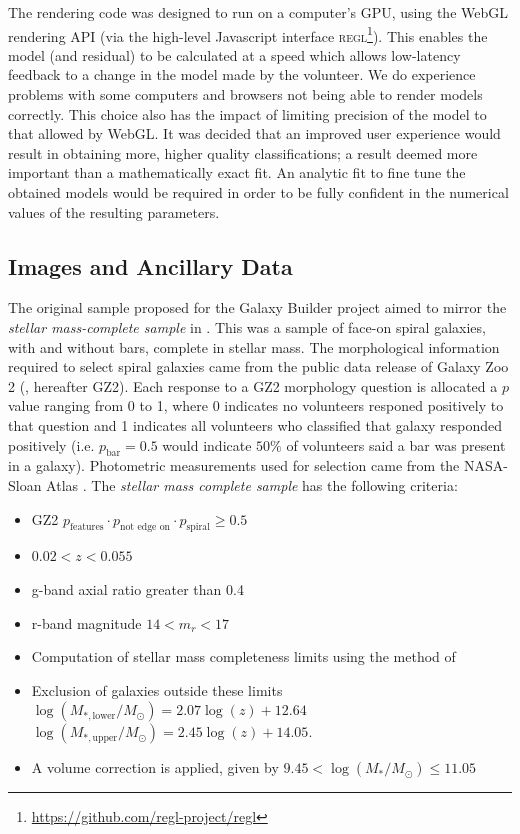 \documentclass[../main.tex]{subfiles}
\begin{document}
The rendering code was designed to run on a computer's GPU, using the WebGL rendering API (via the high-level Javascript interface \textsc{regl}\footnote{\url{https://github.com/regl-project/regl}}). This enables the model (and residual) to be calculated at a speed which allows low-latency feedback to a change in the model made by the volunteer. We do experience problems with some computers and browsers not being able to render models correctly. This choice also has the impact of limiting precision of the model to that allowed by WebGL. It was decided that an improved user experience would result in obtaining more, higher quality classifications; a result deemed more important than a mathematically exact fit. An analytic fit to fine tune the obtained models would be required in order to be fully confident in the numerical values of the resulting parameters.

\subsection{Images and Ancillary Data}
\label{sec:data}
The original sample proposed for the Galaxy Builder project aimed to mirror the \textit{stellar mass-complete sample} in \citet{Hart2017:1708.04628v1}. This was a sample of face-on spiral galaxies, with and without bars, complete in stellar mass. The morphological information required to select spiral galaxies came from the public data release of Galaxy Zoo 2 (\citealt{Willett2013:1308.3496v2}, hereafter GZ2). Each response to a GZ2 morphology question is allocated a $p$ value ranging from 0 to 1, where 0 indicates no volunteers responed positively to that question and 1 indicates all volunteers who classified that galaxy responded positively (i.e. $p_\text{bar} = 0.5$ would indicate $50\%$ of volunteers said a bar was present in a galaxy). Photometric measurements used for selection came from the NASA-Sloan Atlas \citep{2011AJ....142...31B}. The \textit{stellar mass complete sample} has the following criteria:

\begin{itemize}
  \item GZ2 $p_\text{features} \cdot p_\text{not edge on} \cdot p_\text{spiral} \ge 0.5$
  \item $0.02 < z < 0.055$
  \item g-band axial ratio greater than 0.4 
  \item r-band magnitude $14 < m_r < 17$
  \item Computation of stellar mass completeness limits using the method of \citet{Pozzetti2009:0907.5416v2}
  \item Exclusion of galaxies outside these limits\\
    $\log({M_{*,\text{lower}} / M_\odot}) = 2.07\log(z) + 12.64$\\
    $\log({M_{*,\text{upper}} / M_\odot}) = 2.45\log(z) + 14.05$.
  \item A volume correction is applied, given by $9.45 < \log(M_* / M_\odot) \le 11.05$
\end{itemize}
\end{document}
